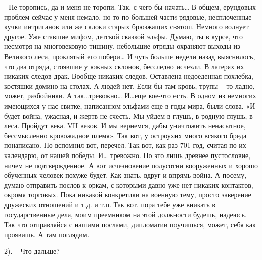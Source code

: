 \documentclass[12pt,a4paper]{book}
\begin{document}
- Не торопись, да и меня не торопи. Так, с чего бы начать… В общем, ерундовых проблем сейчас у меня немало, но то по большей части рядовые, несплоченные кучки интриганов или же склоки старых брюзжащих святош. Немного волнует другое. Уже ставшие мифом, детской сказкой эльфы. Думаю, ты в курсе, что несмотря на многовековую тишину, небольшие отряды охраняют выходы из Великого леса, проклятый его побери… И чуть больше недели назад выяснилось, что два отряда, стоявшие у южных склонов, бесследно исчезли. В лагерях их никаких следов драк. Вообще никаких следов. Оставлена недоеденная похлебка, костяшки домино на столах. А людей нет. Если бы там кровь, трупы – то ладно, может, разбойники. А так…тревожно… И…еще кое-что есть. В одном из немногих имеющихся у нас свитке, написанном эльфами еще в годы мира, были слова. «И будет война, ужасная, и жертв не счесть. Мы уйдем в глушь, в родную глушь, в леса. Пройдут века. VII веков. И мы вернемся, дабы уничтожить ненасытное, бессмысленно кровожадное племя». Так вот, у остроухих много всякого бреда понаписано. Но вспомнил вот, перечел. Так вот, как раз 701 год, считая по их календарю, от нашей победы. И… тревожно. Но это лишь древнее пустословие, ничем не подтвержденное. А вот исчезновение полусотни вооруженных и хорошо обученных человек похуже будет. Как знать, вдруг и впрямь война. А посему, думаю отправить послов к оркам, с которыми давно уже нет никаких контактов, окромя торговых. Пока никакой конкретики на военную тему, просто заверение дружеских отношений и т.д. и т.п. Так вот, пора тебе уже вникать в государственные дела, моим преемником на этой должности будешь, надеюсь. Так что отправляйся с нашими послами, дипломатии поучишься, может, себя как проявишь. А там поглядим.

2). – Что дальше?
\end{document}
